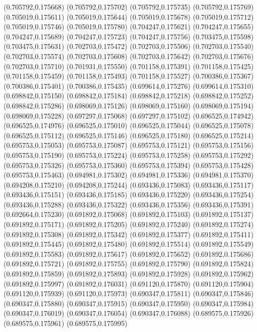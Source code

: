 (0.705792,0.175668)
(0.705792,0.175702)
(0.705792,0.175735)
(0.705792,0.175769)
(0.705019,0.175611)
(0.705019,0.175644)
(0.705019,0.175678)
(0.705019,0.175712)
(0.705019,0.175746)
(0.705019,0.175780)
(0.704247,0.175621)
(0.704247,0.175655)
(0.704247,0.175689)
(0.704247,0.175723)
(0.704247,0.175756)
(0.703475,0.175598)
(0.703475,0.175631)
(0.702703,0.175472)
(0.702703,0.175506)
(0.702703,0.175540)
(0.702703,0.175574)
(0.702703,0.175608)
(0.702703,0.175642)
(0.702703,0.175676)
(0.702703,0.175710)
(0.701931,0.175550)
(0.701158,0.175391)
(0.701158,0.175425)
(0.701158,0.175459)
(0.701158,0.175493)
(0.701158,0.175527)
(0.700386,0.175367)
(0.700386,0.175401)
(0.700386,0.175435)
(0.699614,0.175276)
(0.699614,0.175310)
(0.698842,0.175150)
(0.698842,0.175184)
(0.698842,0.175218)
(0.698842,0.175252)
(0.698842,0.175286)
(0.698069,0.175126)
(0.698069,0.175160)
(0.698069,0.175194)
(0.698069,0.175228)
(0.697297,0.175068)
(0.697297,0.175102)
(0.696525,0.174942)
(0.696525,0.174976)
(0.696525,0.175010)
(0.696525,0.175044)
(0.696525,0.175078)
(0.696525,0.175112)
(0.696525,0.175146)
(0.696525,0.175180)
(0.696525,0.175214)
(0.695753,0.175053)
(0.695753,0.175087)
(0.695753,0.175121)
(0.695753,0.175156)
(0.695753,0.175190)
(0.695753,0.175224)
(0.695753,0.175258)
(0.695753,0.175292)
(0.695753,0.175326)
(0.695753,0.175360)
(0.695753,0.175394)
(0.695753,0.175428)
(0.695753,0.175463)
(0.694981,0.175302)
(0.694981,0.175336)
(0.694981,0.175370)
(0.694208,0.175210)
(0.694208,0.175244)
(0.693436,0.175083)
(0.693436,0.175117)
(0.693436,0.175151)
(0.693436,0.175185)
(0.693436,0.175220)
(0.693436,0.175254)
(0.693436,0.175288)
(0.693436,0.175322)
(0.693436,0.175356)
(0.693436,0.175391)
(0.692664,0.175230)
(0.691892,0.175068)
(0.691892,0.175103)
(0.691892,0.175137)
(0.691892,0.175171)
(0.691892,0.175205)
(0.691892,0.175240)
(0.691892,0.175274)
(0.691892,0.175308)
(0.691892,0.175342)
(0.691892,0.175377)
(0.691892,0.175411)
(0.691892,0.175445)
(0.691892,0.175480)
(0.691892,0.175514)
(0.691892,0.175549)
(0.691892,0.175583)
(0.691892,0.175617)
(0.691892,0.175652)
(0.691892,0.175686)
(0.691892,0.175721)
(0.691892,0.175755)
(0.691892,0.175790)
(0.691892,0.175824)
(0.691892,0.175859)
(0.691892,0.175893)
(0.691892,0.175928)
(0.691892,0.175962)
(0.691892,0.175997)
(0.691892,0.176031)
(0.691120,0.175870)
(0.691120,0.175904)
(0.691120,0.175939)
(0.691120,0.175973)
(0.690347,0.175811)
(0.690347,0.175846)
(0.690347,0.175880)
(0.690347,0.175915)
(0.690347,0.175950)
(0.690347,0.175984)
(0.690347,0.176019)
(0.690347,0.176054)
(0.690347,0.176088)
(0.689575,0.175926)
(0.689575,0.175961)
(0.689575,0.175995)
